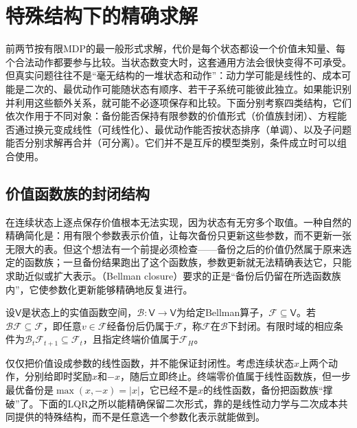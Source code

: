 \section{特殊结构下的精确求解}
\label{sec:rl-planning-structure}

前两节按有限MDP的最一般形式求解，代价是每个状态都设一个价值未知量、每个合法动作都要参与比较。当状态数变大时，这套通用方法会很快变得不可承受。但真实问题往往不是“毫无结构的一堆状态和动作”：动力学可能是线性的、成本可能是二次的、最优动作可能随状态有顺序、若干子系统可能彼此独立。如果能识别并利用这些额外关系，就可能不必逐项保存和比较。下面分别考察四类结构，它们依次作用于不同对象：备份能否保持有限参数的价值形式（价值族封闭）、方程能否通过换元变成线性（可线性化）、最优动作能否按状态排序（单调）、以及子问题能否分别求解再合并（可分离）。它们并不是互斥的模型类别，条件成立时可以组合使用。

\subsection{价值函数族的封闭结构}
\label{sec:rl-planning-closure}

在连续状态上逐点保存价值根本无法实现，因为状态有无穷多个取值。一种自然的精确简化是：用有限个参数表示价值，让每次备份只更新这些参数，而不更新一张无限大的表。但这个想法有一个前提必须检查——备份之后的价值仍然属于原来选定的函数族；一旦备份结果跑出了这个函数族，参数更新就无法精确表达它，只能求助近似或扩大表示。（Bellman closure）要求的正是“备份后仍留在所选函数族内”，它使参数化更新能够精确地反复进行。

\begin{definition}[函数族的Bellman封闭性]
 \label{def:rl-planning-closure}
 设$\mathsf V$是状态上的实值函数空间，$\mathcal B:\mathsf V\to\mathsf V$为给定Bellman算子，$\mathcal F\subseteq\mathsf V$。若$\mathcal B\mathcal F\subseteq\mathcal F$，即任意$v\in\mathcal F$经备份后仍属于$\mathcal F$，称$\mathcal F$在$\mathcal B$下封闭。有限时域的相应条件为$\mathcal B_t\mathcal F_{t+1}\subseteq\mathcal F_t$，且指定终端价值属于$\mathcal F_H$。
\end{definition}

仅仅把价值设成参数的线性函数，并不能保证封闭性。考虑连续状态$x$上两个动作，分别给即时奖励$x$和$-x$，随后立即终止。终端零价值属于线性函数族，但一步最优备份是$\max(x,-x)=|x|$，它已经不是$x$的线性函数，备份把函数族“撑破”了。下面的LQR之所以能精确保留二次形式，靠的是线性动力学与二次成本共同提供的特殊结构，而不是任意选一个参数化表示就能做到。

